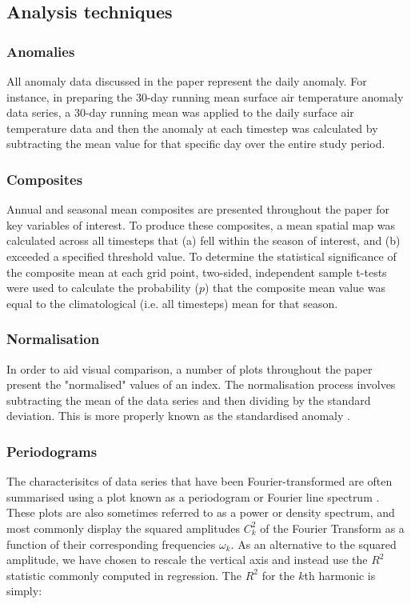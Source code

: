 \subsection{Analysis techniques}

\subsubsection{Anomalies}
All anomaly data discussed in the paper represent the daily anomaly. For instance, in preparing the 30-day running mean surface air temperature anomaly data series, a 30-day running mean was applied to the daily surface air temperature data and then the anomaly at each timestep was calculated by subtracting the mean value for that specific day over the entire study period.

\subsubsection{Composites}
Annual and seasonal mean composites are presented throughout the paper for key variables of interest. To produce these composites, a mean spatial map was calculated across all timesteps that (a) fell within the season of interest, and (b) exceeded a specified threshold value. To determine the statistical significance of the composite mean at each grid point, two-sided, independent sample t-tests were used to calculate the probability ($p$) that the composite mean value was equal to the climatological (i.e. all timesteps) mean for that season.

\subsubsection{Normalisation}
In order to aid visual comparison, a number of plots throughout the paper present the "normalised" values of an index. The normalisation process involves subtracting the mean of the data series and then dividing by the standard deviation. This is more properly known as the standardised anomaly \citep{Wilks2011}. 

\subsubsection{Periodograms} %
The characterisitcs of data series that have been Fourier-transformed are often summarised using a plot known as a periodogram or Fourier line spectrum \citep{Wilks2011}. These plots are also sometimes referred to as a power or density spectrum, and most commonly display the squared amplitudes $C_k^2$ of the Fourier Transform as a function of their corresponding frequencies $\omega_k$. As an alternative to the squared amplitude, we have chosen to rescale the vertical axis and instead use the $R^2$ statistic commonly computed in regression. The $R^2$ for the $k$th harmonic is simply:

